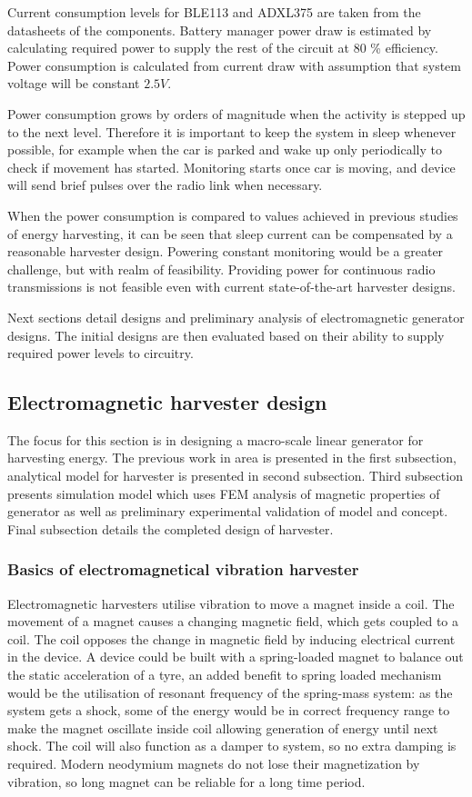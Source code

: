 Current consumption levels for BLE113 and ADXL375 are taken from the datasheets of the components. Battery manager power draw is estimated by calculating required power to supply the rest of the circuit at 80 \% efficiency. Power consumption is calculated from current draw with assumption that system voltage will be constant $2.5 V$.

Power consumption grows by orders of magnitude when the activity is stepped up to the next level. Therefore it is important to keep the system in sleep whenever possible, for example when the car is parked and wake up only periodically to check if movement has started. Monitoring starts once car is moving, and device will send brief pulses over the radio link when necessary.

When the power consumption is compared to values achieved in previous studies of energy harvesting, it can be seen that sleep current can be compensated by a reasonable harvester design. Powering constant monitoring would be a greater challenge, but with realm of feasibility. Providing power for continuous radio transmissions is not feasible even with current state-of-the-art harvester designs. 

Next sections detail designs and preliminary analysis of electromagnetic generator designs. The initial designs are then evaluated based on their ability to supply required power levels to circuitry.

\subsection{Electromagnetic harvester design}
The focus for this section is in designing a macro-scale linear generator for harvesting energy. The previous work in area is presented in the first subsection, analytical model for harvester is presented in second subsection. Third subsection presents simulation model which uses FEM analysis of magnetic properties of generator as well as preliminary experimental validation of model and concept. Final subsection details the completed design of harvester.

\subsubsection{Basics of electromagnetical vibration harvester}
Electromagnetic harvesters utilise vibration to move a magnet inside a coil. The movement of a magnet causes a changing magnetic field, which gets coupled to a coil. The coil opposes the change in magnetic field by inducing electrical current in the device. A device could be built with a spring-loaded magnet to balance out the static acceleration of a tyre, an added benefit to spring loaded mechanism would be the utilisation of resonant frequency of the spring-mass system: as the system gets a shock, some of the energy would be in correct frequency range to make the magnet oscillate inside coil allowing generation of energy until next shock. The coil will also function as a damper to system, so no extra damping is required. Modern neodymium magnets do not lose their magnetization by vibration, so long magnet can be reliable for a long time period. 

